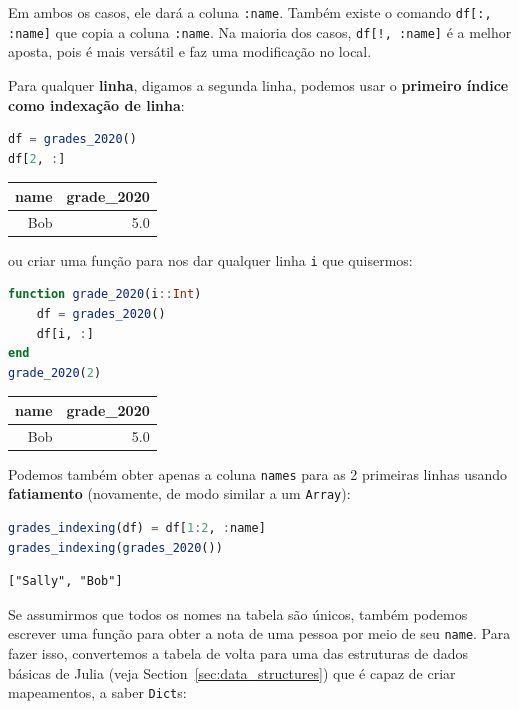 \documentclass[
  notoc %
]{tufte-book}
\newcommand{\passthrough}[1]{#1}
\begin{document}
Em ambos os casos, ele dará a coluna \passthrough{\lstinline!:name!}.
Também existe o comando \passthrough{\lstinline!df[:, :name]!} que copia
a coluna \passthrough{\lstinline!:name!}. Na maioria dos casos,
\passthrough{\lstinline"df[!, :name]"} é a melhor aposta, pois é mais
versátil e faz uma modificação no local.

Para qualquer \textbf{linha}, digamos a segunda linha, podemos usar o
\textbf{primeiro índice como indexação de linha}:

\begin{lstlisting}[language=Julia]
df = grades_2020()
df[2, :]
\end{lstlisting}

\begin{longtable}[]{@{}rr@{}}
\toprule
name & grade\_2020 \\
\midrule
\endhead
Bob & 5.0 \\
\bottomrule
\end{longtable}

ou criar uma função para nos dar qualquer linha
\passthrough{\lstinline!i!} que quisermos:

\begin{lstlisting}[language=Julia]
function grade_2020(i::Int)
    df = grades_2020()
    df[i, :]
end
grade_2020(2)
\end{lstlisting}

\begin{longtable}[]{@{}rr@{}}
\toprule
name & grade\_2020 \\
\midrule
\endhead
Bob & 5.0 \\
\bottomrule
\end{longtable}

Podemos também obter apenas a coluna \passthrough{\lstinline!names!}
para as 2 primeiras linhas usando \textbf{fatiamento} (novamente, de
modo similar a um \passthrough{\lstinline!Array!}):

\begin{lstlisting}[language=Julia]
grades_indexing(df) = df[1:2, :name]
grades_indexing(grades_2020())
\end{lstlisting}

\begin{lstlisting}[language=Output]
["Sally", "Bob"]
\end{lstlisting}

Se assumirmos que todos os nomes na tabela são únicos, também podemos
escrever uma função para obter a nota de uma pessoa por meio de seu
\passthrough{\lstinline!name!}. Para fazer isso, convertemos a tabela de
volta para uma das estruturas de dados básicas de Julia (veja
Section~\ref{sec:data_structures}) que é capaz de criar mapeamentos, a
saber \passthrough{\lstinline!Dict!}s:
\end{document}
